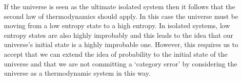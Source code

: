 \documentclass[main.tex]{subfiles}
\begin{document}

If the universe is seen as the ultimate isolated system then it follows that the second law of thermodynamics should apply. In this case the universe must be moving from a low entropy state to a high entropy. In isolated systems, low entropy states are also highly improbably and this leads to the idea that our universe's initial state is a highly improbable one. However, this requires us to accept that we can extend the idea of probability to the initial state of the universe and that we are not committing a `category error' by considering the universe as a thermodynamic system in this way.
\end{document}
